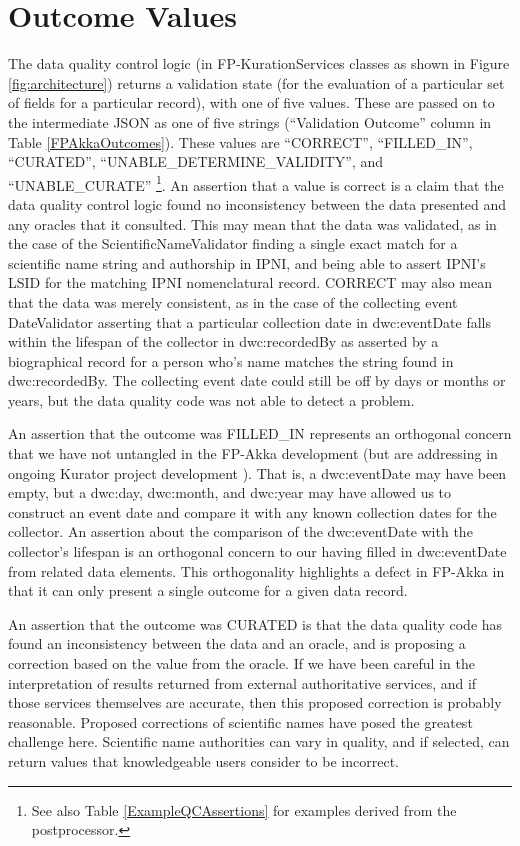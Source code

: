 \documentclass{article}
\begin{document}
\section{Outcome Values}
The data quality control logic (in FP-KurationServices classes as shown in Figure \ref{fig:architecture}) returns a validation state (for the evaluation of a particular set of fields for a particular record), with one of five values.  These are passed on to the intermediate JSON as one of five strings (``Validation Outcome'' column in Table \ref{FPAkkaOutcomes}).  These values are “CORRECT”, “FILLED\_IN”, “CURATED”, “UNABLE\_DETERMINE\_VALIDITY”, and “UNABLE\_CURATE”
\footnote{See also Table \ref{ExampleQCAssertions} for examples derived from the postprocessor.}.
An assertion that a value is correct is a claim that the data quality control logic found no inconsistency between the data presented and any oracles that it consulted.  
This may mean that the data was validated, as in the case of the ScientificNameValidator finding a single exact match for a scientific name string and authorship in IPNI, and being able to assert IPNI's LSID for the matching IPNI nomenclatural record.
CORRECT may also mean that the data was merely consistent, as in the case of the collecting event DateValidator asserting that a particular collection date in dwc:eventDate falls within the lifespan of the collector in dwc:recordedBy as asserted by a biographical record for a person who's name matches the string found in dwc:recordedBy.  The collecting event date could still be off by days or months or years, but the data quality code was not able to detect a problem.

An assertion that the outcome was FILLED\_IN represents an orthogonal concern that we have not untangled in the FP-Akka development (but are addressing in ongoing Kurator project development \citep{Kurator_wiki_2016}).  That is, a dwc:eventDate may have been empty, but a dwc:day, dwc:month, and dwc:year may have allowed us to construct an event date and compare it with any known collection dates for the collector.  An assertion about the comparison of the dwc:eventDate with the collector's lifespan is an orthogonal concern to our having filled in dwc:eventDate from related data elements.  This orthogonality highlights a defect in FP-Akka in that it can only present a single outcome for a given data record. 

An assertion that the outcome was CURATED is that the data quality code has found an inconsistency between the data and an oracle, and is proposing a correction based on the value from the oracle.  If we have been careful in the interpretation of results returned from external authoritative services, and if those services themselves are accurate, then this proposed correction is probably reasonable.  Proposed corrections of scientific names have posed the greatest challenge here.  Scientific name authorities can vary in quality, and if selected, can return values that knowledgeable users consider to be incorrect. 
\end{document}
